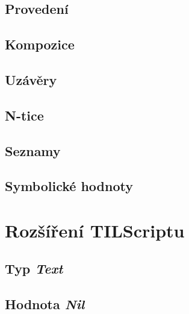 \subsection{Provedení}

\subsection{Kompozice}

\subsection{Uzávěry}

\subsection{N-tice}

\subsection{Seznamy}

\subsection{Symbolické hodnoty} \label{symbolic-values}

\section{Rozšíření TILScriptu}

\subsection{Typ \textit{Text}} \label{text-type}

\subsection{Hodnota \textit{Nil}} \label{nil-value}

\endinput
